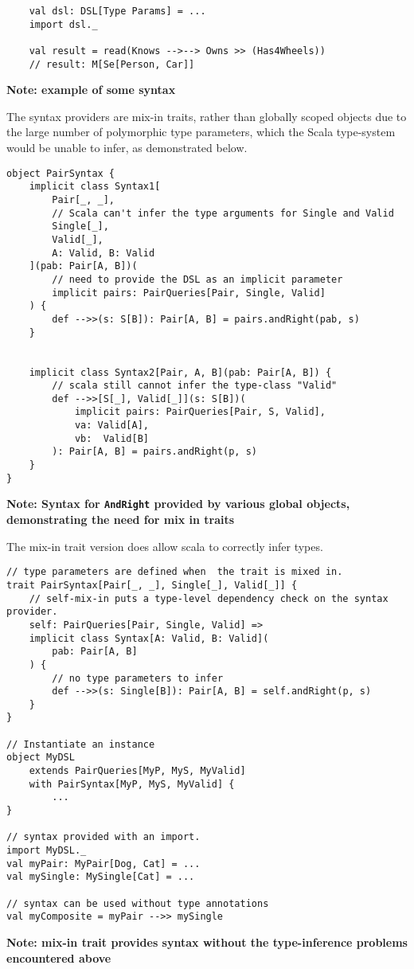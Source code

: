 \documentclass{report}
\newcommand \2[0]{\textbf{2}}
\newcommand \3[0]{\textbf{3}}
\newcommand{\todo}[1]{\textbf{#1}}
\begin{document}
\begin{verbatim}
    val dsl: DSL[Type Params] = ...
    import dsl._

    val result = read(Knows -->--> Owns >> (Has4Wheels))
    // result: M[Se[Person, Car]]
\end{verbatim}
\todo{Note: example of some syntax}

The syntax providers are mix-in traits, rather than globally scoped objects due to the large number of polymorphic type parameters, which the Scala type-system would be unable to infer, as demonstrated below.

\begin{verbatim}
object PairSyntax {
    implicit class Syntax1[
        Pair[_, _], 
        // Scala can't infer the type arguments for Single and Valid
        Single[_], 
        Valid[_], 
        A: Valid, B: Valid
    ](pab: Pair[A, B])(
        // need to provide the DSL as an implicit parameter
        implicit pairs: PairQueries[Pair, Single, Valid]
    ) {
        def -->>(s: S[B]): Pair[A, B] = pairs.andRight(pab, s)
    }
    
    
    implicit class Syntax2[Pair, A, B](pab: Pair[A, B]) {
        // scala still cannot infer the type-class "Valid"
        def -->>[S[_], Valid[_]](s: S[B])(
            implicit pairs: PairQueries[Pair, S, Valid],
            va: Valid[A],
            vb:  Valid[B]
        ): Pair[A, B] = pairs.andRight(p, s)
    }
}
\end{verbatim}
\todo{Note: Syntax for \texttt{AndRight} provided by various global objects, demonstrating the need for mix in traits}


The mix-in trait version does allow scala to correctly infer types.

\begin{verbatim}
// type parameters are defined when  the trait is mixed in.
trait PairSyntax[Pair[_, _], Single[_], Valid[_]] {
    // self-mix-in puts a type-level dependency check on the syntax provider.
    self: PairQueries[Pair, Single, Valid] => 
    implicit class Syntax[A: Valid, B: Valid](
        pab: Pair[A, B]
    ) {
        // no type parameters to infer
        def -->>(s: Single[B]): Pair[A, B] = self.andRight(p, s)
    }
}

// Instantiate an instance
object MyDSL
    extends PairQueries[MyP, MyS, MyValid] 
    with PairSyntax[MyP, MyS, MyValid] {
        ...
}

// syntax provided with an import.
import MyDSL._
val myPair: MyPair[Dog, Cat] = ...
val mySingle: MySingle[Cat] = ...

// syntax can be used without type annotations
val myComposite = myPair -->> mySingle
\end{verbatim}
\todo{Note: mix-in trait provides syntax without the type-inference problems encountered above}
\end{document}

